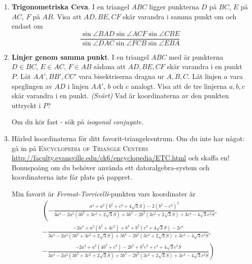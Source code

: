 \begin{enumerate}
\item \textbf{Trigonometriska Ceva}. I en triangel $ABC$ ligger punkterna
    $D$ på $BC$, $E$ på $AC$, $F$ på $AB$. Visa att $AD, BE, CF$ skär varandra
    i samma punkt om och endast om 
    \[
    \frac{\sin \angle BAD \sin \angle ACF \sin \angle CBE}
         {\sin \angle DAC \sin \angle FCB \sin \angle EBA}
    \]

\item \textbf{Linjer genom samma punkt}. 
    I en triangel $ABC$ med är punkterna $D \in BC$, $E \in AC$, $F \in AB$ sådana att
    $AD, BE, CF$ skär varandra i en punkt $P$. Låt $AA', BB', CC'$ vara bisektriserna 
    dragna ur $A, B, C$. Låt linjen $a$ vara speglingen av $AD$ i linjen $AA'$, $b$ och $c$ analogt.
    Visa att de tre linjerna $a,b,c$ skär varandra i en punkt. \textit{(Svårt)} Vad är koordinaterna av den
    punkten uttryckt i $P$? 

    {\tiny{Om du kör fast - sök på \textit{isogonal conjugate}}}.

\item Härled koordinaterna för ditt favorit-triangelcentrum. Om du inte har något: 
    gå in på \textsc{Encyclopedia of Triangle Centers} \url{http://faculty.evansville.edu/ck6/encyclopedia/ETC.html}
    och skaffa en! Bonuspoäng om du behöver använda ett datoralgebra-system och koordinaterna inte får
    plats på pappret.
        
        Min favorit är \textit{Fermat-Torricelli}-punkten vars koordinater är 
        \begin{eqnarray*}
        \left(-\frac{a^4+a^2 \left(b^2+c^2+4 \sqrt{3} S\right)-2 \left(b^2-c^2\right)^2}{3 a^4-2 a^2 \left(3 b^2+3 c^2+2 \sqrt{3} S\right)+3 b^4-2 b^2 \left(3 c^2+2 \sqrt{3} S\right)+3 c^4-4 \sqrt{3} c^2 S},\right.\\
        -\frac{-2 a^4+a^2 \left(b^2+4 c^2\right)+b^4+b^2 \left(c^2+4 \sqrt{3} S\right)-2 c^4}{3 a^4-2 a^2 \left(3 b^2+3 c^2+2 \sqrt{3} S\right)+3 b^4-2 b^2 \left(3 c^2+2 \sqrt{3} S\right)+3 c^4-4 \sqrt{3} c^2 S},\\
        \left.-\frac{-2 a^4+a^2 \left(4 b^2+c^2\right)-2 b^4+b^2 c^2+c^4+4 \sqrt{3} c^2 S}{3 a^4-2 a^2 \left(3 b^2+3 c^2+2 \sqrt{3} S\right)+3 b^4-2 b^2 \left(3 c^2+2 \sqrt{3} S\right)+3 c^4-4 \sqrt{3} c^2 S}\right)
        \end{eqnarray*}

\end{enumerate}

